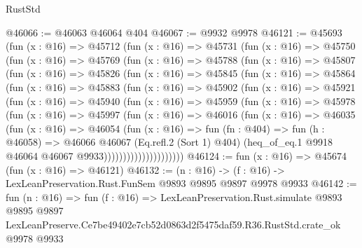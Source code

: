 \begin{lexlean}{RustStd}
\begin{coremodule}
@46066 := @46063 @46064 @404
@46067 := @9932 @9978
@46121 := @45693
    (fun (x : @16) =>
    @45712
      (fun (x : @16) =>
      @45731
        (fun (x : @16) =>
        @45750
          (fun (x : @16) =>
          @45769
            (fun (x : @16) =>
            @45788
              (fun (x : @16) =>
              @45807
                (fun (x : @16) =>
                @45826
                  (fun (x : @16) =>
                  @45845
                    (fun (x : @16) =>
                    @45864
                      (fun (x : @16) =>
                      @45883
                        (fun (x : @16) =>
                        @45902
                          (fun (x : @16) =>
                          @45921
                            (fun (x : @16) =>
                            @45940
                              (fun (x : @16) =>
                              @45959
                                (fun (x : @16) =>
                                @45978
                                  (fun (x : @16) =>
                                  @45997
                                    (fun (x : @16) =>
                                    @46016
                                      (fun (x : @16) =>
                                      @46035
                                        (fun (x : @16) =>
                                        @46054
                                          (fun (x : @16) =>
                                          fun (fn : @404) =>
                                          fun (h : @46058) =>
                                          @46066
                                            @46067
                                            (Eq.refl.{2} (Sort 1) @404)
                                            (heq_of_eq.{1}
                                              @9918
                                              @46064
                                              @46067
                                              @9933)))))))))))))))))))))
@46124 := fun (x : @16) => @45674 (fun (x : @16) => @46121)
@46132 := (n : @16) -> (f : @16) -> LexLeanPreservation.Rust.FunSem @9893 @9895 @9897 @9978 @9933
@46142 := fun (n : @16) =>
  fun (f : @16) =>
  LexLeanPreservation.Rust.simulate
    @9893
    @9895
    @9897
    LexLeanPreserve.Ce7be49402e7cb52d0863d2f5475daf59.R36.RustStd.crate_ok
    @9978
    @9933
\end{coremodule}
\end{lexlean}
